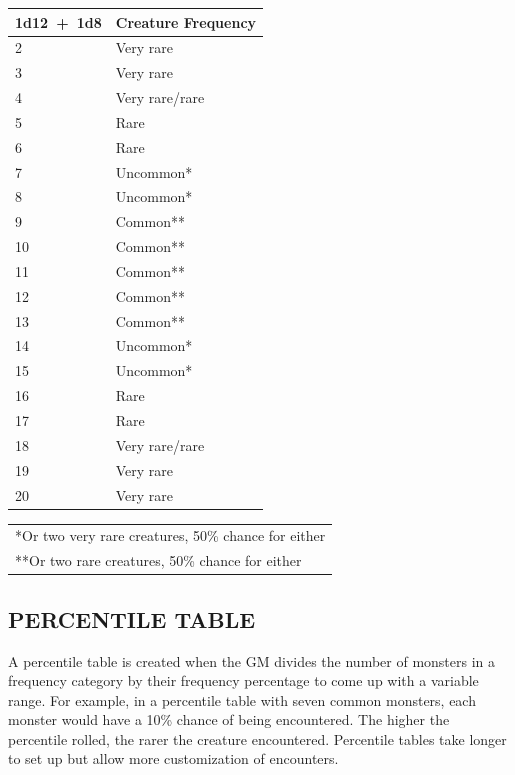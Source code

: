 \begin{multicols}{2}
\begin{minipage}{\columnwidth}
\label{twototwentytable}
\noindent
\begin{tabular}{|p{}|p{}|}
\hline
1d12~+~1d8	& Creature Frequency \\
\hline\hline
\rowcolor[gray]{.9}2	& Very rare \\
3	& Very rare \\
\rowcolor[gray]{.9}4	& Very rare/rare \\
5	& Rare \\
\rowcolor[gray]{.9}6	& Rare \\
7	& Uncommon* \\
\rowcolor[gray]{.9}8	& Uncommon* \\
9	& Common** \\
\rowcolor[gray]{.9}10	& Common** \\
11	& Common** \\
\rowcolor[gray]{.9}12	& Common** \\
13	& Common** \\
\rowcolor[gray]{.9}14	& Uncommon* \\
15	& Uncommon* \\
\rowcolor[gray]{.9}16	& Rare \\
17	& Rare \\
\rowcolor[gray]{.9}18	& Very rare/rare \\
19	& Very rare \\
\rowcolor[gray]{.9}20	& Very rare \\
\hline
\end{tabular}
\noindent\begin{tabular}{p{}}
*Or two very rare creatures, 50\% chance for either \\
**Or two rare creatures, 50\% chance for either \\
\end{tabular}\vspace{.5em}

\end{minipage}

\subsection{PERCENTILE TABLE}

A percentile table is created when the GM divides the number of monsters in a frequency category by their frequency percentage to come up with a variable range.  For example, in a percentile table with seven common monsters, each monster would have a 10\% chance of being encountered.  The higher the percentile rolled, the rarer the creature encountered.  Percentile tables take longer to set up but allow more customization of encounters.


\end{multicols}
